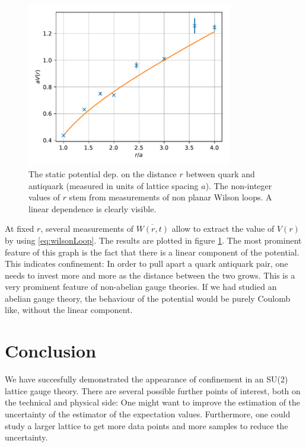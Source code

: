 \documentclass{scrartcl}
\begin{document}
\begin{figure}[htpb]
    \centering
    \includegraphics[width=0.8\textwidth]{figs/aVfitBeta23}
    \caption{The static potential dep. on the distance $r$ between quark and
    antiquark (measured in units of lattice spacing $a$). The non-integer values
    of $r$ stem from measurements of non planar Wilson loops. A linear dependence
    is clearly visible.}
    \label{fig:aVfit}
\end{figure}

At fixed $r$, several measurements of $\overline{W(r,t)}$ allow to extract the
value of $V(r)$ by using \eqref{eq:wilsonLoop}. The results are plotted in
figure \ref{fig:aVfit}. The most prominent feature of this graph is the fact
that there is a linear component of the potential. This indicates confinement:
In order to pull apart a quark antiquark pair, one needs to invest more and more
as the distance between the two grows. This is a very prominent feature of
non-abelian gauge theories. If we had studied an abelian gauge theory, the
behaviour of the potential would be purely Coulomb like, without the linear
component.

\section{Conclusion} \label{sec:conclusion}
We have succesfully demonstrated the appearance of confinement in an SU(2) lattice
gauge theory. There are several possible further points of interest, both on the
technical and physical side: One might want to improve the estimation of the
uncertainty of the estimator of the expectation values. Furthermore, one could
study a larger lattice to get more data points and more samples to reduce the
uncertainty.
\end{document}
